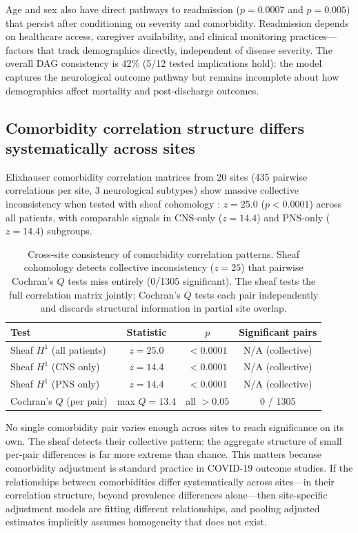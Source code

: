 \documentclass{article}
\begin{document}
Age and sex also have direct pathways to readmission ($p = 0.0007$ and $p = 0.005$) that persist after conditioning on severity and comorbidity.
Readmission depends on healthcare access, caregiver availability, and clinical monitoring practices---factors that track demographics directly, independent of disease severity.
The overall DAG consistency is 42\% (5/12 tested implications hold): the model captures the neurological outcome pathway but remains incomplete about how demographics affect mortality and post-discharge outcomes.


\subsection{Comorbidity correlation structure differs systematically across sites}

Elixhauser comorbidity correlation matrices \cite{elixhauser1998} from 20 sites (435 pairwise correlations per site, 3 neurological subtypes) show massive collective inconsistency when tested with sheaf cohomology \cite{robinson2017sheaf}: $z = 25.0$ ($p < 0.0001$) across all patients, with comparable signals in CNS-only ($z = 14.4$) and PNS-only ($z = 14.4$) subgroups.

\begin{table}[t]
\centering
\caption{Cross-site consistency of comorbidity correlation patterns. Sheaf cohomology detects collective inconsistency ($z = 25$) that pairwise Cochran's $Q$ tests miss entirely (0/1305 significant). The sheaf tests the full correlation matrix jointly; Cochran's $Q$ tests each pair independently and discards structural information in partial site overlap.}
\label{tab:sheaf}
\begin{tabular}{lccc}
\toprule
Test & Statistic & $p$ & Significant pairs \\
\midrule
Sheaf $H^1$ (all patients) & $z = 25.0$ & $< 0.0001$ & N/A (collective) \\
Sheaf $H^1$ (CNS only) & $z = 14.4$ & $< 0.0001$ & N/A (collective) \\
Sheaf $H^1$ (PNS only) & $z = 14.4$ & $< 0.0001$ & N/A (collective) \\
Cochran's $Q$ (per pair) & max $Q = 13.4$ & all $> 0.05$ & 0 / 1305 \\
\bottomrule
\end{tabular}
\end{table}

No single comorbidity pair varies enough across sites to reach significance on its own.
The sheaf detects their collective pattern: the aggregate structure of small per-pair differences is far more extreme than chance.
This matters because comorbidity adjustment is standard practice in COVID-19 outcome studies.
If the relationships between comorbidities differ systematically across sites---in their correlation structure, beyond prevalence differences alone---then site-specific adjustment models are fitting different relationships, and pooling adjusted estimates implicitly assumes homogeneity that does not exist.
\end{document}
